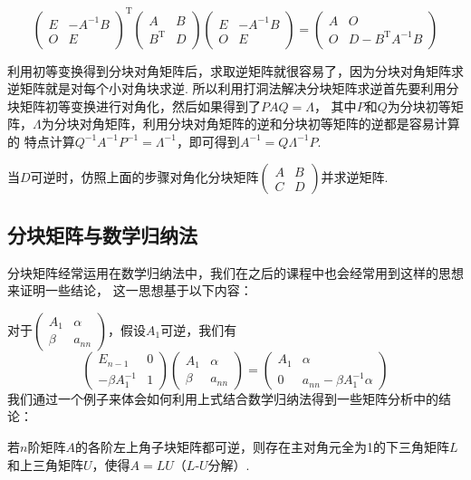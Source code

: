 \begin{enumerate}
    \[ \begin{pmatrix}
        E & -A^{-1}B \\ O & E
    \end{pmatrix}^\mathrm{T}\begin{pmatrix}
        A & B \\ B^\mathrm{T} & D
    \end{pmatrix}\begin{pmatrix}
        E & -A^{-1}B \\ O & E
    \end{pmatrix}=\begin{pmatrix}
        A & O \\ O & D-B^\mathrm{T}A^{-1}B
    \end{pmatrix} \]
\end{enumerate}
利用初等变换得到分块对角矩阵后，求取逆矩阵就很容易了，因为分块对角矩阵求逆矩阵就是对每个小对角块求逆.
所以利用打洞法解决分块矩阵求逆首先要利用分块矩阵初等变换进行对角化，然后如果得到了$PAQ=\Lambda$，
其中$P$和$Q$为分块初等矩阵，$\Lambda$为分块对角矩阵，利用分块对角矩阵的逆和分块初等矩阵的逆都是容易计算的
特点计算$Q^{-1}A^{-1}P^{-1}=\Lambda^{-1}$，即可得到$A^{-1}=Q\Lambda^{-1}P$.
\begin{example}
    当$D$可逆时，仿照上面的步骤对角化分块矩阵$\begin{pmatrix}A & B \\ C & D\end{pmatrix}$并求逆矩阵.
\end{example}
\begin{solution}

\end{solution}

\subsection{分块矩阵与数学归纳法}
分块矩阵经常运用在数学归纳法中，我们在之后的课程中也会经常用到这样的思想来证明一些结论，
这一思想基于以下内容：

对于$\begin{pmatrix}
    A_1 & \alpha \\ \beta & a_{nn}
\end{pmatrix}$，假设$A_1$可逆，我们有
\[\begin{pmatrix}
    E_{n-1} & 0 \\ -\beta A_1^{-1} & 1
\end{pmatrix}\begin{pmatrix}
    A_1 & \alpha \\ \beta & a_{nn}
\end{pmatrix}=\begin{pmatrix}
    A_1 & \alpha \\ 0 & a_{nn}-\beta A_1^{-1}\alpha
\end{pmatrix}\]
我们通过一个例子来体会如何利用上式结合数学归纳法得到一些矩阵分析中的结论：
\begin{example}
    若$n$阶矩阵$A$的各阶左上角子块矩阵都可逆，则存在主对角元全为1的下三角矩阵$L$和上三角矩阵$U$，使得$A=LU$（$L$-$U$分解）.
\end{example}
\begin{solution}

\end{solution}

